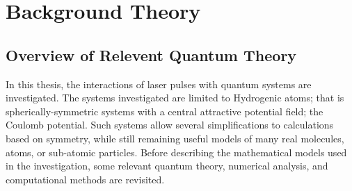
\chapter{Background Theory} %

\label{Chapter1} %


\newcommand{\keyword}[1]{\textbf{#1}}
\newcommand{\tabhead}[1]{\textbf{#1}}
\newcommand{\code}[1]{\texttt{#1}}
\newcommand{\file}[1]{\texttt{\bfseries#1}}
\newcommand{\option}[1]{\texttt{\itshape#1}}


\section{Overview of Relevent Quantum Theory}


In this thesis, the interactions of laser pulses with quantum systems are investigated. The systems investigated are limited to Hydrogenic atoms; that is spherically-symmetric systems with a central attractive potential field; the Coulomb potential. Such systems allow several simplifications to calculations based on symmetry, while still remaining useful models of many real molecules, atoms, or sub-atomic particles. Before describing the mathematical models used in the investigation, some relevant quantum theory, numerical analysis, and computational methods are revisited.

